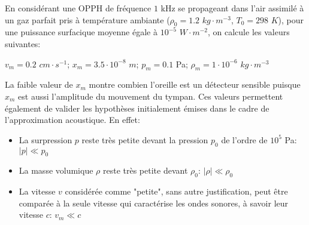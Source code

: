 \documentclass[a4paper, 12pt]{article}
\begin{document}
\noindent{}

En considérant une OPPH de fréquence $1$ kHz se propageant dans l'air assimilé à un gaz parfait pris à température ambiante ($\rho_{0} = 1.2$ $kg\cdot m^{-3}$, $T_{0} = 298$ $K$), pour une puissance surfacique moyenne égale à $10^{-5}$ $W\cdot m^{-2}$, on calcule les valeurs suivantes:
\begin{center}
$v_{m} = 0.2$ $cm\cdot s^{-1}$; $x_{m} = 3.5\cdot 10^{-8}$ $m$; $p_{m} = 0.1$ Pa; $\rho_{m} = 1\cdot 10^{-6}$ $kg\cdot m^{-3}$
\end{center}

La faible valeur de $x_{m}$ montre combien l'oreille est un détecteur sensible puisque $x_{m}$ est aussi l'amplitude du mouvement du tympan. Ces valeurs permettent également de valider les hypothèses initialement émises dans le cadre de l'approximation acoustique. En effet:
\begin{itemize}
\item La surpression $p$ reste très petite devant la pression $p_{0}$ de l'ordre de $10^{5}$ Pa: $\left|p\right|\ll p_{0}$
\item La masse volumique $\rho$ reste très petite devant $\rho_{0}$: $\left|\rho\right|\ll \rho_{0}$
\item La vitesse $v$ considérée comme "petite", sans autre justification, peut être comparée à la seule vitesse qui caractérise les ondes sonores, à savoir leur vitesse $c$: $v_{m}\ll c$
\end{itemize}
\end{document}
